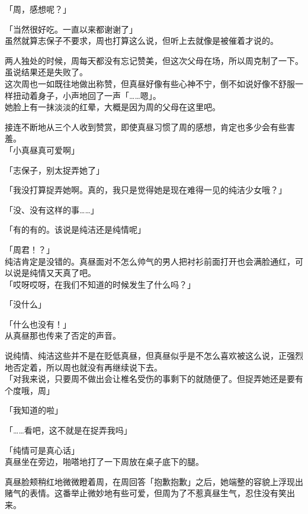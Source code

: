 「周，感想呢？」

「当然很好吃。一直以来都谢谢了」\\

虽然就算志保子不要求，周也打算这么说，但听上去就像是被催着才说的。

两人独处的时候，周每天都没有忘记赞美，但这次父母在场，所以周克制了一下。虽说结果还是失败了。\\

这次周也一如既往地做出称赞，但真昼好像有些心神不宁，倒不如说好像不舒服一样扭动着身子，小声地回了一声「……嗯」。\\

她脸上有一抹淡淡的红晕，大概是因为周的父母在这里吧。

接连不断地从三个人收到赞赏，即使真昼习惯了周的感想，肯定也多少会有些害羞。\\

「小真昼真可爱啊」

「志保子，别太捉弄她了」

「我没打算捉弄她啊。真的，我只是觉得她是现在难得一见的纯洁少女哦？」

「没、没有这样的事……」

「有的有的。该说是纯洁还是纯情呢」

「周君！？」\\

纯洁肯定是没错的。真昼面对不怎么帅气的男人把衬衫前面打开也会满脸通红，可以说是纯情又天真了吧。\\

「哎呀哎呀，在我们不知道的时候发生了什么吗？」

「没什么」

「什么也没有！」\\

从真昼那也传来了否定的声音。

说纯情、纯洁这些并不是在贬低真昼，但真昼似乎是不怎么喜欢被这么说，正强烈地否定着，所以周也就没有再继续说下去。\\

「对我来说，只要周不做出会让椎名受伤的事剩下的就随便了。但捉弄她还是要有个度哦，周」

「我知道的啦」

「……看吧，这不就是在捉弄我吗」

「纯情可是真心话」\\

真昼坐在旁边，啪嗒地打了一下周放在桌子底下的腿。

真昼脸颊稍红地微微瞪着周，在周回答「抱歉抱歉」之后，她端整的容貌上浮现出赌气的表情。这番举止微妙地有些可爱，但周为了不惹真昼生气，忍住没有笑出来。\\


